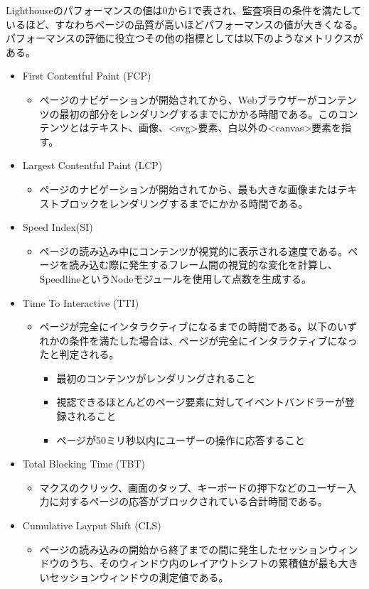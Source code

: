 Lighthouseのパフォーマンスの値は0から1で表され、監査項目の条件を満たしているほど、すなわちページの品質が高いほどパフォーマンスの値が大きくなる。パフォーマンスの評価に役立つその他の指標としては以下のようなメトリクスがある。

\begin{itemize}
    \item First Contentful Paint (FCP)
    \begin{itemize}
        \item ページのナビゲーションが開始されてから、Webブラウザーがコンテンツの最初の部分をレンダリングするまでにかかる時間である。このコンテンツとはテキスト、画像、<svg>要素、白以外の<canvas>要素を指す。
    \end{itemize}
    \item Largest Contentful Paint (LCP)
    \begin{itemize}
        \item ページのナビゲーションが開始されてから、最も大きな画像またはテキストブロックをレンダリングするまでにかかる時間である。
    \end{itemize}
    \item Speed Index(SI)
    \begin{itemize}
        \item ページの読み込み中にコンテンツが視覚的に表示される速度である。ページを読み込む際に発生するフレーム間の視覚的な変化を計算し、SpeedlineというNodeモジュールを使用して点数を生成する。
    \end{itemize}
    \item Time To Interactive (TTI)
    \begin{itemize}
        \item ページが完全にインタラクティブになるまでの時間である。以下のいずれかの条件を満たした場合は、ページが完全にインタラクティブになったと判定される。
        \begin{itemize}
            \item 最初のコンテンツがレンダリングされること
            \item 視認できるほとんどのページ要素に対してイベントバンドラーが登録されること
            \item ページが50ミリ秒以内にユーザーの操作に応答すること
        \end{itemize}
    \end{itemize}
    \item Total Blocking Time (TBT)
    \begin{itemize}
        \item マクスのクリック、画面のタップ、キーボードの押下などのユーザー入力に対するページの応答がブロックされている合計時間である。
    \end{itemize}
    \item Cumulative Layput Shift (CLS)
    \begin{itemize}
        \item ページの読み込みの開始から終了までの間に発生したセッションウィンドウのうち、そのウィンドウ内のレイアウトシフトの累積値が最も大きいセッションウィンドウの測定値である。
    \end{itemize}
\end{itemize}

